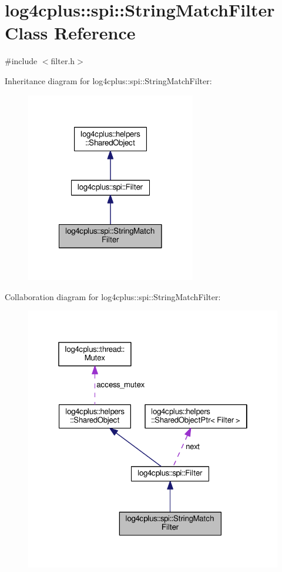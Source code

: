 \hypertarget{classlog4cplus_1_1spi_1_1StringMatchFilter}{\section{log4cplus\-:\-:spi\-:\-:String\-Match\-Filter Class Reference}
\label{classlog4cplus_1_1spi_1_1StringMatchFilter}
}


{\ttfamily \#include $<$filter.\-h$>$}



Inheritance diagram for log4cplus\-:\-:spi\-:\-:String\-Match\-Filter\-:
\nopagebreak
\begin{figure}[H]
\begin{center}
\leavevmode
\includegraphics[width=210pt]{classlog4cplus_1_1spi_1_1StringMatchFilter__inherit__graph}
\end{center}
\end{figure}


Collaboration diagram for log4cplus\-:\-:spi\-:\-:String\-Match\-Filter\-:
\nopagebreak
\begin{figure}[H]
\begin{center}
\leavevmode
\includegraphics[width=321pt]{classlog4cplus_1_1spi_1_1StringMatchFilter__coll__graph}
\end{center}
\end{figure}
